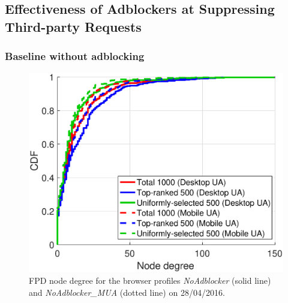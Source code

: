 \documentclass[compsoc, conference, letterpaper, 10pt, times]{IEEEtran}
\begin{document}




\subsection{Effectiveness of Adblockers at Suppressing Third-party Requests}
\subsubsection{Baseline without adblocking}

  \begin{figure}
 \centering

 \includegraphics[width=.45\textwidth]{figures/comparative-cdf-first-node-degree-no-adblocker.eps}
 
 \caption{FPD node degree for the browser profiles \textit{NoAdblocker} (solid line) and \textit{NoAdblocker\_MUA} (dotted line) on 28/04/2016.}
 \label{fig:first_node_degree}
\end{figure}
\end{document}

